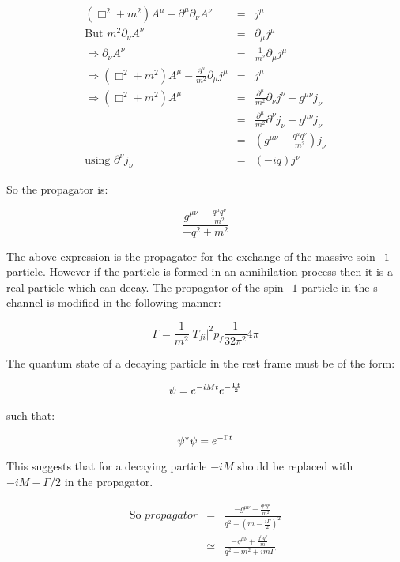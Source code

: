 \begin{eqnarray*}
  \left( \Box^2 + m^2\right) A^{\mu} - \partial^{\mu}\partial_{\nu}A^{\nu} & = & j^{\mu} \\
  \textrm{But }m^2\partial_{\nu}A^{\nu} & = & \partial_{\mu}j^{\mu} \\
  \Rightarrow \partial_{\nu}A^{\nu} & = & \frac{1}{m^2}\partial_{\mu}j^{\mu} \\
  \Rightarrow \left( \Box^2 + m^2\right)A^{\mu} - \frac{\partial^{\mu}}{m^2}\partial_{\mu}j^{\mu} & = & j^{\mu} \\
  \Rightarrow \left( \Box^2 + m^2\right)A^{\mu} & = & \frac{\partial^{\mu}}{m^2}\partial_{\nu}j^{\nu} + g^{\mu\nu}j_{\nu} \\
  & = & \frac{\partial^{\mu}}{m^2}\partial^{\nu}j_{\nu} + g^{\mu\nu}j_{\nu} \\
  & = & \left( g^{\mu\nu} - \frac{q^{\mu}q^{\nu}}{m^2}\right)j_{\nu} \\
  \textrm{using } \partial^{\nu}j_{\nu} & = & (-iq)j^{\nu}
\end{eqnarray*}

So the propagator is:

\[
  \frac{g^{\mu\nu}-\frac{q^{\mu}q^{\nu}}{m^2}}{-q^2 + m^2}
\]

The above expression is the propagator for the exchange of the massive soin$-1$ particle.  However if the particle is formed in an annihilation process then it is a real particle which can decay.  The propagator of the spin$-1$ particle in the s-channel is modified in the following manner:

\[
  \Gamma = \frac{1}{m^2}|T_{fi}|^2p_f\frac{1}{32\pi^2}4\pi
\]

The quantum state of a decaying particle in the rest frame must be of the form:

\[
  \psi = e^{-iMt}e^{-\frac{\Gamma t}{2}}
\]

such that:

\[
  \psi^{\star}\psi = e^{-\Gamma t}
\]

This suggests that for a decaying particle $-iM$ should be replaced with $-iM -\Gamma/2$ in the propagator.

\begin{eqnarray*}
  \textrm{So } propagator & = & \frac{-g^{\mu\nu} + \frac{q^{\mu}q^{\nu}}{m^2}}{q^2 - \left(m - \frac{i\Gamma}{2}\right)^2} \\
  & \simeq & \frac{-g^{\mu\nu} + \frac{q^{\mu}q^{\nu}}{m}}{q^2 - m^2 + im\Gamma}
\end{eqnarray*}

